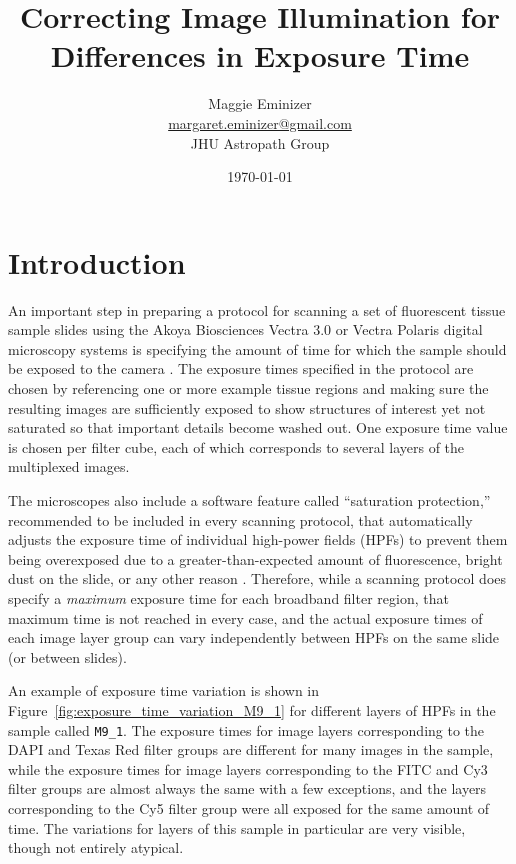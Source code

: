 \documentclass[letterpaper,11pt]{article}
\title{Correcting Image Illumination for Differences in Exposure Time}
\author{Maggie Eminizer\\ \url{margaret.eminizer@gmail.com}\\ JHU Astropath Group}
\date{\today}
\newcommand{\reffig}[1]{Figure~\ref{#1}}
\begin{document}
\maketitle

\linenumbers

\abstract{}

\section{Introduction}
\label{sec:introduction}

An important step in preparing a protocol for scanning a set of fluorescent tissue sample slides using the Akoya Biosciences Vectra 3.0 or Vectra Polaris digital microscopy systems is specifying the amount of time for which the sample should be exposed to the camera \cite{vectra_user_manual,polaris_user_manual}. The exposure times specified in the protocol are chosen by referencing one or more example tissue regions and making sure the resulting images are sufficiently exposed to show structures of interest yet not saturated so that important details become washed out. One exposure time value is chosen per filter cube, each of which corresponds to several layers of the multiplexed images.

The microscopes also include a software feature called ``saturation protection,'' recommended to be included in every scanning protocol, that automatically adjusts the exposure time of individual high-power fields (HPFs) to prevent them being overexposed due to a greater-than-expected amount of fluorescence, bright dust on the slide, or any other reason \cite{vectra_user_manual,polaris_user_manual}. Therefore, while a scanning protocol does specify a \textit{maximum} exposure time for each broadband filter region, that maximum time is not reached in every case, and the actual exposure times of each image layer group can vary independently between HPFs on the same slide (or between slides). 

An example of exposure time variation is shown in \reffig{fig:exposure_time_variation_M9_1} for different layers of HPFs in the sample called \texttt{M9\_1}. The exposure times for image layers corresponding to the DAPI and Texas Red filter groups are different for many images in the sample, while the exposure times for image layers corresponding to the FITC and Cy3 filter groups are almost always the same with a few exceptions, and the layers corresponding to the Cy5 filter group were all exposed for the same amount of time. The variations for layers of this sample in particular are very visible, though not entirely atypical.
\end{document}
